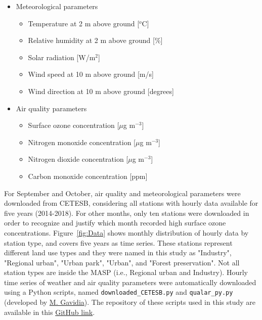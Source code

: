 \begin{itemize}
	\item Meteorological parameters
		\begin{itemize}
			\item Temperature at 2 m above ground [$^o$C]
			\item Relative humidity at 2 m above ground [\%]
			\item Solar radiation [W/m$^2$]
			\item Wind speed at 10 m above ground [m/s]
			\item Wind direction at 10 m above ground [degrees]
		\end{itemize}
		
	\item Air quality parameters
		\begin{itemize}
			\item Surface ozone concentration [$\mu$g m$^{-3}$]
			\item Nitrogen monoxide concentration [$\mu$g m$^{-3}$]
			\item Nitrogen dioxide concentration [$\mu$g m$^{-3}$]
			\item Carbon monoxide concentration [ppm] 
		\end{itemize}
\end{itemize}

For September and October, air quality and meteorological parameters were downloaded from CETESB, considering all stations with hourly data available for five years (2014-2018).
For other months, only ten stations were downloaded in order to recognize and justify which month recorded high surface ozone concentrations.
Figure~\ref{fig:Data} shows monthly distribution of hourly data by station type, and covers five years as time series.
These stations represent different land use types and they were named in this study as "Industry", "Regional urban", "Urban park", "Urban", and "Forest preservation".
Not all station types are inside the MASP (i.e., Regional urban and Industry). 
 Hourly time series of weather and air quality parameters were automatically downloaded using a Python scripts, named \verb|downloaded_CETESB.py| and \verb|qualar_py.py| (developed by \href{https://github.com/quishqa/qualR.py}{M. Gavidia}).
The repository of these scripts used in this study are available in this \href{https://github.com/adelgadop/PythonObsData}{GitHub link}.

